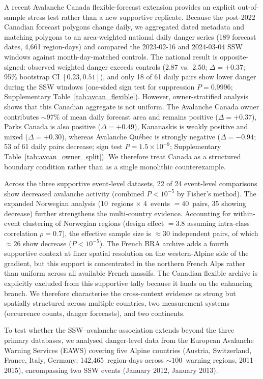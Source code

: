 \documentclass[11pt,letterpaper]{article}
\begin{document}
A recent Avalanche Canada flexible-forecast extension provides an explicit out-of-sample stress test rather than a new supportive replicate. Because the post-2022 Canadian forecast polygons change daily, we aggregated dated metadata and matching polygons to an area-weighted national daily danger series (189 forecast dates, 4{,}661 region-days) and compared the 2023-02-16 and 2024-03-04 SSW windows against month-day-matched controls. The national result is opposite-signed: observed weighted danger exceeds controls (2.87 vs.\ 2.50; $\Delta = +0.37$; 95\% bootstrap CI $[0.23, 0.51]$), and only 18 of 61 daily pairs show lower danger during the SSW windows (one-sided sign test for suppression $P = 0.9996$; Supplementary Table~\ref{tab:avcan_flexible}). However, owner-stratified analysis shows that this Canadian aggregate is not uniform. The Avalanche Canada owner contributes $\sim$97\% of mean daily forecast area and remains positive ($\Delta = +0.37$), Parks Canada is also positive ($\Delta = +0.49$), Kananaskis is weakly positive and mixed ($\Delta = +0.30$), whereas Avalanche Qu\'ebec is strongly negative ($\Delta = -0.94$; 53 of 61 daily pairs decrease; sign test $P = 1.5 \times 10^{-9}$; Supplementary Table~\ref{tab:avcan_owner_split}). We therefore treat Canada as a structured boundary condition rather than as a single monolithic counterexample.

Across the three supportive event-level datasets, 22 of 24 event-level comparisons show decreased avalanche activity (combined $P < 10^{-5}$ by Fisher's method). The expanded Norwegian analysis (10~regions $\times$ 4~events $= 40$~pairs, 35 showing decrease) further strengthens the multi-country evidence. Accounting for within-event clustering of Norwegian regions (design effect $= 3.8$ assuming intra-class correlation $\rho = 0.7$), the effective sample size is $\approx 30$ independent pairs, of which $\approx 26$ show decrease ($P < 10^{-5}$). The French BRA archive adds a fourth supportive context at finer spatial resolution on the western-Alpine side of the gradient, but this support is concentrated in the northern French Alps rather than uniform across all available French massifs. The Canadian flexible archive is explicitly excluded from this supportive tally because it lands on the enhancing branch. We therefore characterise the cross-context evidence as strong but spatially structured across multiple countries, two measurement systems (occurrence counts, danger forecasts), and two continents.

To test whether the SSW--avalanche association extends beyond the three primary databases, we analysed danger-level data from the European Avalanche Warning Services (EAWS) covering five Alpine countries (Austria, Switzerland, France, Italy, Germany; 142,465~region-days across ${\sim}100$~warning regions, 2011--2015), encompassing two SSW events (January 2012, January 2013).
\end{document}
